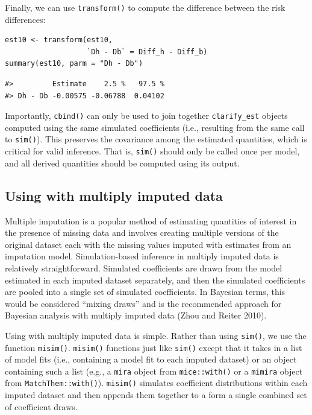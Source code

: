 Finally, we can use \texttt{transform()} to compute the difference between the risk differences:

\begin{verbatim}
est10 <- transform(est10,
                   `Dh - Db` = Diff_h - Diff_b)
summary(est10, parm = "Dh - Db")
\end{verbatim}

\begin{verbatim}
#>         Estimate    2.5 %   97.5 %
#> Dh - Db -0.00575 -0.06788  0.04102
\end{verbatim}

Importantly, \texttt{cbind()} can only be used to join together \texttt{clarify\_est} objects computed using the same simulated coefficients (i.e., resulting from the same call to \texttt{sim()}). This preserves the covariance among the estimated quantities, which is critical for valid inference. That is, \texttt{sim()} should only be called once per model, and all derived quantities should be computed using its output.

\hypertarget{using-with-multiply-imputed-data}{%
\subsection{\texorpdfstring{Using  with multiply imputed data}{Using  with multiply imputed data}}\label{using-with-multiply-imputed-data}}

Multiple imputation is a popular method of estimating quantities of interest in the presence of missing data and involves creating multiple versions of the original dataset each with the missing values imputed with estimates from an imputation model. Simulation-based inference in multiply imputed data is relatively straightforward. Simulated coefficients are drawn from the model estimated in each imputed dataset separately, and then the simulated coefficients are pooled into a single set of simulated coefficients. In Bayesian terms, this would be considered ``mixing draws'' and is the recommended approach for Bayesian analysis with multiply imputed data (Zhou and Reiter 2010).

Using  with multiply imputed data is simple. Rather than using \texttt{sim()}, we use the function \texttt{misim()}. \texttt{misim()} functions just like \texttt{sim()} except that it takes in a list of model fits (i.e., containing a model fit to each imputed dataset) or an object containing such a list (e.g., a \texttt{mira} object from \texttt{mice::with()} or a \texttt{mimira} object from \texttt{MatchThem::with()}). \texttt{misim()} simulates coefficient distributions within each imputed dataset and then appends them together to a form a single combined set of coefficient draws.

